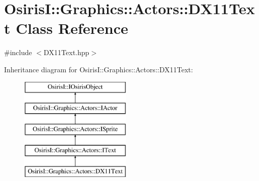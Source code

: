 \hypertarget{class_osiris_i_1_1_graphics_1_1_actors_1_1_d_x11_text}{\section{Osiris\-I\-:\-:Graphics\-:\-:Actors\-:\-:D\-X11\-Text Class Reference}
\label{class_osiris_i_1_1_graphics_1_1_actors_1_1_d_x11_text}
}


{\ttfamily \#include $<$D\-X11\-Text.\-hpp$>$}

Inheritance diagram for Osiris\-I\-:\-:Graphics\-:\-:Actors\-:\-:D\-X11\-Text\-:\begin{figure}[H]
\begin{center}
\leavevmode
\includegraphics[height=5.000000cm]{class_osiris_i_1_1_graphics_1_1_actors_1_1_d_x11_text}
\end{center}
\end{figure}
